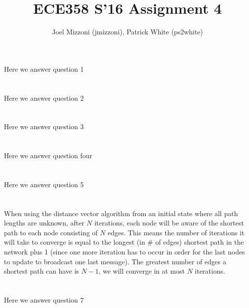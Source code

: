 \documentclass[10pt,a4paper]{article}
\author{Joel Mizzoni (jmizzoni), Patrick White (ps2white)}
\begin{document}
\title{ECE358 S'16 Assignment 4}
\maketitle
\section{}
Here we answer question 1
\section{}
Here we answer question 2
\section{}
Here we answer question 3
\section{}
Here we answer question four
\section{}
Here we answer question 5
\section{}
When using the distance vector algorithm from an initial state where all path lengths are unknown, after $N$ iterations, each node will be aware of the shortest path to each node consisting of $N$ edges. This means the number of iterations it will take to converge is equal to the longest (in # of edges) shortest path in the network plus 1 (since one more iteration has to occur in order for the last nodes to update to broadcast one last message). The greatest number of edges a shortest path can have is $N - 1$, we will converge in at most $N$ iterations.
\section{}
Here we answer question 7
\end{document}
